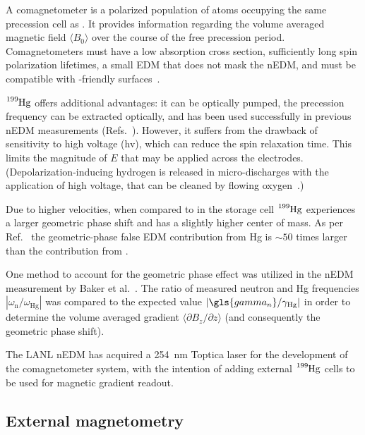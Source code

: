 
A comagnetometer is a polarized population of atoms occupying the same precession cell as \ucn. It provides information regarding the volume averaged magnetic field $\langle B_0 \rangle$ over the course of the free precession period. Comagnetometers must have a low \ucn absorption cross section, sufficiently long spin polarization lifetimes, a small EDM that does not mask the nEDM, and must be compatible with \ucn-friendly surfaces~\cite{golubUCN}.

$\ce{^{199}Hg}$ offers additional advantages: it can be optically pumped, the precession frequency can be extracted optically, and has been used successfully in previous nEDM measurements (Refs.~\cite{BAK06, ABE20}). However, it suffers from the drawback of sensitivity to high voltage (\acrshort*{hv}), which can reduce the spin relaxation time. This limits the magnitude of $E$ that may be applied across the electrodes. (Depolarization-inducing hydrogen is released in micro-discharges with the application of high voltage, that can be cleaned by flowing oxygen~\cite{baker_apparatus_2014}.)

Due to higher velocities, when compared to \ucn in the storage cell $\ce{^{199}Hg}$ experiences a larger geometric phase shift and has a slightly higher center of mass. As per Ref.~\cite{pendlebury_revised_2015} the geometric-phase false EDM contribution from Hg is $\sim 50$ times larger than the contribution from \ucn. 

One method to account for the geometric phase effect was utilized in the nEDM measurement by Baker et al.~\cite{BAK06}. The ratio of measured neutron and Hg frequencies $|\omega_\text{n}/\omega_\text{Hg}|$ was compared to the expected value $|\gls{gamma_n}/\gamma_\text{Hg}|$ in order to determine the volume averaged gradient $\langle \partial B_z/\partial z \rangle$ (and consequently the geometric phase shift).

The LANL nEDM has acquired a \qty{254}{\nano\meter} Toptica laser for the development of the comagnetometer system, with the intention of adding external $\ce{^{199}Hg}$ cells to be used for magnetic gradient readout.


\subsection
{
    External magnetometry
}

